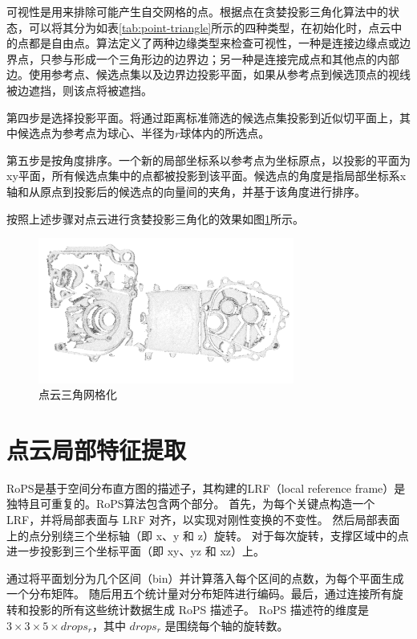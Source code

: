 可视性是用来排除可能产生自交网格的点。根据点在贪婪投影三角化算法中的状态，可以将其分为如表\ref{tab:point-triangle}所示的四种类型，在初始化时，点云中的点都是自由点。算法定义了两种边缘类型来检查可视性，一种是连接边缘点或边界点，只参与形成一个三角形边的边界边；另一种是连接完成点和其他点的内部边。使用参考点、候选点集以及边界边投影平面，如果从参考点到候选顶点的视线被边遮挡，则该点将被遮挡。

第四步是选择投影平面。将通过距离标准筛选的候选点集投影到近似切平面上，其中候选点为参考点为球心、半径为$r$球体内的所选点。

第五步是按角度排序。一个新的局部坐标系以参考点为坐标原点，以投影的平面为xy平面，所有候选点集中的点都被投影到该平面。候选点的角度是指局部坐标系x轴和从原点到投影后的候选点的向量间的夹角，并基于该角度进行排序。

按照上述步骤对点云进行贪婪投影三角化的效果如图\ref{fig:triangle}所示。

\begin{figure}[htbp]
    \centering
    \includegraphics[width=0.75\textwidth]{figures/triangle.png}
    \caption{点云三角网格化}
    \label{fig:triangle}
\end{figure}

\section{点云局部特征提取}
RoPS\cite{yulanguoRoPSLocalFeature2013}是基于空间分布直方图的描述子，其构建的LRF（local reference frame）是独特且可重复的。RoPS算法包含两个部分。 首先，为每个关键点构造一个 LRF，并将局部表面与 LRF 对齐，以实现对刚性变换的不变性。 然后局部表面上的点分别绕三个坐标轴（即 x、y 和 z）旋转。 对于每次旋转，支撑区域中的点进一步投影到三个坐标平面（即 xy、yz 和 xz）上。

通过将平面划分为几个区间（bin）并计算落入每个区间的点数，为每个平面生成一个分布矩阵。 随后用五个统计量对分布矩阵进行编码。最后，通过连接所有旋转和投影的所有这些统计数据生成 RoPS 描述子。 RoPS 描述符的维度是$3\times3\times5\times drops_{r}$，其中 $drops_{r}$ 是围绕每个轴的旋转数。

